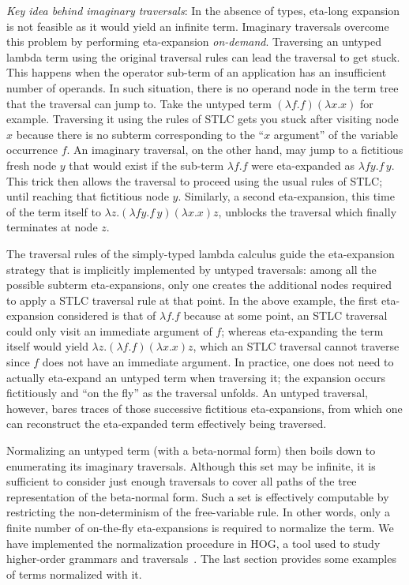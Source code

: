 \documentclass{elsarticle}
\theoremstyle{plain}
\theoremstyle{definition}
\theoremstyle{remark}
\begin{document}
\emph{Key idea behind imaginary traversals}: In the absence of types, eta-long expansion is not feasible as it would yield an infinite term. Imaginary traversals overcome this problem by performing eta-expansion \emph{on-demand}.
Traversing an untyped lambda term using the original traversal rules can lead
the traversal to get stuck. This happens when the operator sub-term of an application has an insufficient number of operands. In such situation, there is no operand node in the term tree that the traversal can jump to.
Take the untyped term $(\lambda f.f)(\lambda x.x)$ for example. Traversing it using the rules of STLC gets you stuck after visiting node $x$ because there is no subterm corresponding to the ``$x$ argument'' of the variable occurrence $f$.
An imaginary traversal, on the other hand, may jump to a fictitious fresh node $y$ that would exist if the sub-term $\lambda f .f$ were eta-expanded
as $\lambda f y.f\, y$. This trick then allows the traversal to proceed using the usual rules of STLC; until reaching that fictitious node $y$.
Similarly, a second eta-expansion, this time of the term itself to
$\lambda z. (\lambda f y.f\, y)(\lambda x.x) z$,
unblocks the traversal which finally terminates at node $z$.

The traversal rules of the simply-typed lambda calculus guide the eta-expansion strategy that is implicitly implemented by untyped traversals:
 among all the possible subterm eta-expansions, only one creates the additional nodes required to apply a STLC traversal rule at that point.
  In the above example, the  first eta-expansion considered is that of $\lambda f .f$ because at some point, an STLC traversal could only
   visit an immediate argument of $f$; whereas eta-expanding the term itself would yield $\lambda z. (\lambda f .f)(\lambda x.x) z$,
    which an STLC traversal cannot traverse since $f$ does not have an immediate argument.
In practice, one does not need to actually eta-expand an untyped term when traversing it; the expansion occurs fictitiously and ``on the fly'' as the traversal unfolds.
 An untyped traversal, however, bares traces of those successive fictitious eta-expansions, from which
  one can reconstruct the eta-expanded term effectively being traversed.

Normalizing an untyped term (with a beta-normal form) then boils down to  enumerating its imaginary traversals. Although this set may be infinite, it is sufficient to consider just enough traversals to cover all paths of the tree representation of the beta-normal form. Such a set is effectively computable by restricting the non-determinism of the free-variable rule. In other words, only a finite number of on-the-fly eta-expansions is required to normalize the term. We have implemented the normalization procedure in HOG, a tool used to study higher-order grammars and traversals~\cite{Blum-HogTool}. The last section provides some examples of terms normalized with it.
\end{document}

